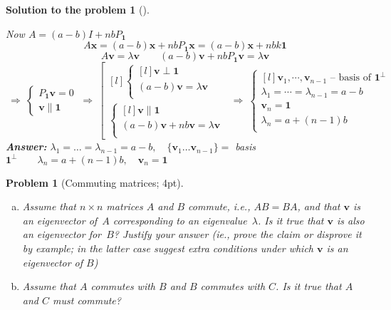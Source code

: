 \documentclass[12pt,a4]{article}
\newtheorem{problem}{Problem}
\newtheorem{solution}{Solution to the problem}
\newcommand{\bv}{{\mathbf v}}
\newcommand{\bx}{{\mathbf x}}
\newcommand{\one}{{\mathbf 1}}
\newcommand{\answer}[1]{\textbf{Answer:} #1}
\begin{document}
{\begin{solution}[]
\begin{enumerate}[(a)]
Now $A = (a-b)I + nbP_{\one}$ 
\[
A\bx = (a-b)\bx + nbP_{\one}\bx = (a-b)\bx + nb k \one
\]
\[
A\bv = \lambda\bv
\qquad
(a-b)\bv + nb P_{\one} \bv = \lambda\bv
\]
\[
~\Rightarrow~
\left \{ \begin{matrix}
P_{\one} \bv = 0\\
\bv \parallel \one
\end{matrix} \right .
~\Rightarrow~
\left [ \begin{matrix}[l]
\left \{ \begin{matrix}[l]
\bv \perp \one \\
(a-b)\bv = \lambda\bv \\ 
\end{matrix} \right . \\[10pt]
\left \{ \begin{matrix}[l]
\bv \parallel \one \\
(a-b)\bv + nb\bv = \lambda\bv \\ 
\end{matrix} \right .
\end{matrix} \right .
~\Rightarrow~
\left \{ \begin{matrix}[l]
\bv_1, \cdots, \bv_{n-1} \text{ -- basis of } \one^\perp \\
\lambda_1 = \cdots =\lambda_{n-1} = a-b \\ 
\bv_n = \one \\
\lambda_n = a + (n-1)b \\ 
\end{matrix} \right .
\]
\answer{$
\lambda_1 = \dots = \lambda_{n-1} = a-b,
\quad
\{\bv_1 \dots \bv_{n-1}\} =$ basis $\one^\perp
\qquad
\lambda_n = a + (n-1)b,
\quad
\bv_n = \one
$}
\end{enumerate}
\end{solution}
}



\begin{problem}[Commuting matrices; 4pt]\rm
	\begin{enumerate}[(a)]
		\item Assume that $n\times n$ matrices $A$ and $B$ commute, i.e., $AB=BA$,  and that $\bv$ is an eigenvector of~$A$ corresponding to an eigenvalue~$\lambda$. Is it true that $\bv$ is also an eigenvector for~$B$? Justify your answer (ie., prove the claim or disprove it by example; in the latter case suggest extra conditions under which $\bv$ is an eigenvector of $B$)
		\item Assume that $A$ commutes with $B$ and $B$ commutes with $C$. Is it true that $A$ and $C$ must commute?
	\end{enumerate}
\end{problem}
\end{document}
